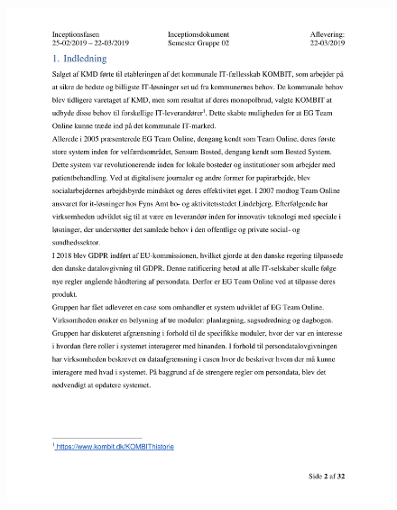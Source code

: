 \begin{figure}[hb]
  \includegraphics[scale = 0.33]{./PNG/Inceptions/Gruppe 02 + InceptionsDokument-03.jpg} 
\end{figure}


